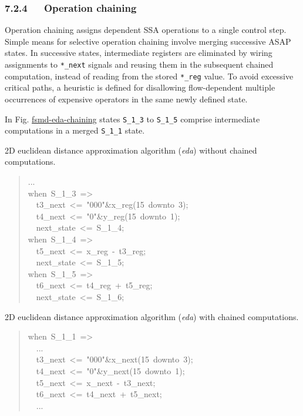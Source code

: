 \documentclass[a4paper]{article}
\begin{document}
\subsubsection{7.2.4~~~Operation chaining%
  \label{operation-chaining}%
}

Operation chaining assigns dependent SSA operations to a single control step.
Simple means for selective operation chaining involve merging successive ASAP
states. In successive states, intermediate registers are eliminated by wiring
assignments to \texttt{*\_next} signals and reusing them in the subsequent chained
computation, instead of reading from the stored \texttt{*\_reg} value. To avoid
excessive critical paths, a heuristic is defined for disallowing flow-dependent
multiple occurrences of expensive operators in the same newly defined state.

In Fig. \hyperref[fsmd-eda-chaining]{fsmd-eda-chaining} states \texttt{S\_1\_3} to \texttt{S\_1\_5} comprise intermediate
computations in a merged \texttt{S\_1\_1} state.

\label{fsmd-eda-nochaining}
2D euclidean distance approximation algorithm (\emph{eda}) without chained
computations.
%
\begin{quote}{\ttfamily \raggedright \noindent
...\\
when~S\_1\_3~=>\\
~~t3\_next~<=~"000"\&x\_reg(15~downto~3);\\
~~t4\_next~<=~"0"\&y\_reg(15~downto~1);\\
~~next\_state~<=~S\_1\_4;\\
when~S\_1\_4~=>\\
~~t5\_next~<=~x\_reg~-~t3\_reg;\\
~~next\_state~<=~S\_1\_5;\\
when~S\_1\_5~=>\\
~~t6\_next~<=~t4\_reg~+~t5\_reg;\\
~~next\_state~<=~S\_1\_6;
}
\end{quote}

\label{fsmd-eda-chaining}
2D euclidean distance approximation algorithm (\emph{eda}) with chained computations.
%
\begin{quote}{\ttfamily \raggedright \noindent
when~S\_1\_1~=>\\
~~...\\
~~t3\_next~<=~"000"\&x\_next(15~downto~3);\\
~~t4\_next~<=~"0"\&y\_next(15~downto~1);\\
~~t5\_next~<=~x\_next~-~t3\_next;\\
~~t6\_next~<=~t4\_next~+~t5\_next;\\
~~...
}
\end{quote}
\end{document}
